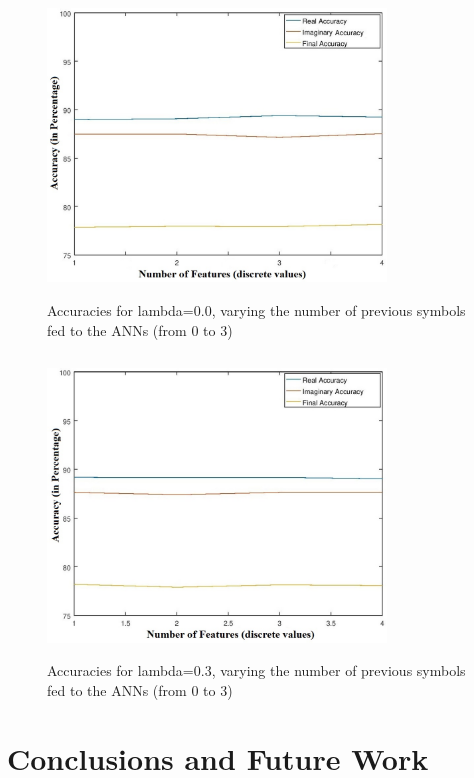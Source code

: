 \documentclass[10pt]{IEEEtran}
\begin{document}
\begin{figure}[h]
\centering
\includegraphics[width=9cm, height=8cm]{lambda0.jpg}
\caption{Accuracies for lambda=0.0, varying the number of previous symbols fed to the ANNs (from 0 to 3)}
\end{figure}

\begin{figure}[h]
\centering
\includegraphics[width=9cm, height=8cm]{lambda03.jpg}
\caption{Accuracies for lambda=0.3, varying the number of previous symbols fed to the ANNs (from 0 to 3)}
\end{figure}

\section{Conclusions and Future Work} %
\end{document}
